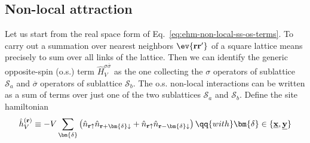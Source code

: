 {\color{tabred}\subsection{Non-local attraction}

Let us start from the real space form of Eq.~\eqref{eq:ehm-non-local-ss-os-terms}. To carry out a summation over nearest neighbors $\ev{\mathbf{r}\mathbf{r}'}$ of a square lattice means precisely to sum over all links of the lattice. Then we can identify the generic opposite-spin (o.s.) term $\hat H_V^{\sigma \overline{\sigma}}$ as the one collecting the $\sigma$ operators of sublattice $\mathcal{S}_a$ and $\overline{\sigma}$ operators of sublattice $\mathcal{S}_b$. The o.s. non-local interactions can be written as a sum of terms over just one of the two sublattices $\mathcal{S}_a$ and $\mathcal{S}_b$. Define the site hamiltonian
\begin{equation}\label{eq:ehm-mft-onsite-hamiltonian}
	\hat h_V^{(\mathbf{r})} \equiv -V \sum_{\bm{\delta}} \left(
	\hat n_{\mathbf{r}\uparrow} \hat n_{\mathbf{r}+\bm{\delta}\downarrow} + \hat n_{\mathbf{r}\uparrow} \hat n_{\mathbf{r}-\bm{\delta} \downarrow}
	\right)
	\qq{with}
	\bm{\delta} \in \lbrace
	\underline{\mathbf{x}},\underline{\mathbf{y}}
	\rbrace
\end{equation}

}
